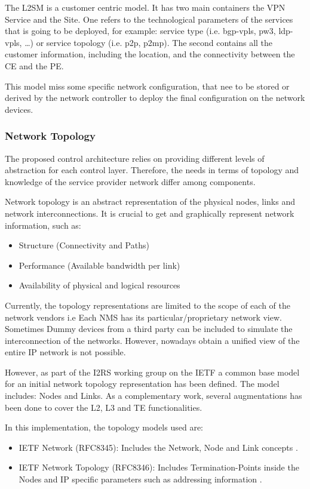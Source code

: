 \documentclass[a4paper,fleqn]{cas-dc}
\begin{document}
The L2SM is a customer centric model. It has two main containers the VPN Service and the Site. One refers to the technological parameters of the services that is going to be deployed, for example: service type (i.e. bgp-vpls, pw3, ldp-vpls, \dots) or service topology (i.e. p2p, p2mp). The second contains all the customer information, including the location, and the connectivity between the CE and the PE. 

This model miss some specific network configuration, that nee to be stored or derived by the network controller to deploy the final configuration on the network devices. 

\subsubsection{Network Topology}
\label{section:topo}

The proposed control architecture relies on providing different levels of abstraction for each control layer. Therefore, the needs in terms of topology and knowledge of the service provider network differ among components. 

Network topology is an abstract representation of the physical nodes, links and network interconnections. It is crucial to get and graphically represent network information, such as:
\begin{itemize}
    \item Structure (Connectivity and Paths)
    \item Performance (Available bandwidth per link)
    \item Availability of physical and logical resources
\end{itemize}

Currently, the topology representations are limited to the scope of each of the network vendors i.e Each NMS has its particular/proprietary network view. Sometimes Dummy devices from a third party can be included to simulate the interconnection of the networks. However, nowadays obtain a unified view of the entire IP network is not possible.

However, as part of the I2RS working group on the IETF a common base model for an initial network topology representation has been defined. The model includes: Nodes and Links. As a complementary work, several augmentations has been done to cover the L2, L3 and TE functionalities.

In this implementation, the topology models used are: 
\begin{itemize}
\item IETF Network (RFC8345): Includes the Network, Node and Link concepts \cite{clemm2018yang}.
\item IETF Network Topology (RFC8346): Includes Termination-Points inside the Nodes and IP specific parameters such as addressing information \cite{varga2018internet}.
\end{itemize}
\end{document}
